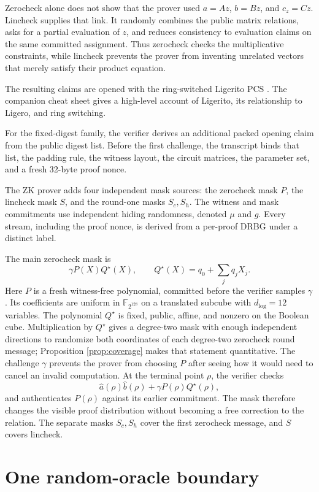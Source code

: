 \documentclass[11pt]{article}
\theoremstyle{definition}
\newcommand{\F}{\mathbb{F}}
\newcommand{\K}{\F_{2^{128}}}
\begin{document}
Zerocheck alone does not show that the prover used $a=Az$, $b=Bz$, and
$c_z=Cz$.  Lincheck supplies that link.  It randomly combines the public
matrix relations, asks for a partial evaluation of $z$, and reduces consistency
to evaluation claims on the same committed assignment.  Thus zerocheck checks
the multiplicative constraints, while lincheck prevents the prover from
inventing unrelated vectors that merely satisfy their product equation.

The resulting claims are opened with the ring-switched Ligerito PCS
\cite{Ligerito,DP24}.  The companion cheat sheet gives a high-level account of
Ligerito, its relationship to Ligero, and ring switching.

For the fixed-digest family, the verifier derives an additional packed opening
claim from the public digest list.  Before the first challenge, the transcript
binds that list, the padding rule, the witness layout, the circuit matrices, the
parameter set, and a fresh 32-byte proof nonce.

The ZK prover adds four independent mask sources: the zerocheck mask $P$, the
lincheck mask $S$, and the round-one masks $S_c,S_h$.  The witness and mask
commitments use independent hiding randomness, denoted $\mu$ and $g$.  Every
stream, including the proof nonce, is derived from a per-proof DRBG under a
distinct label.

The main zerocheck mask is
\[
  \gamma P(X)Q^\star(X),
  \qquad
  Q^\star(X)=q_0+\sum_j q_jX_j.
\]
Here $P$ is a fresh witness-free polynomial, committed before the verifier
samples $\gamma$.  Its coefficients are uniform in $\K$ on a translated
subcube with $d_{\log}=12$ variables.  The polynomial $Q^\star$ is fixed,
public, affine, and nonzero on the Boolean cube.  Multiplication by $Q^\star$
gives a degree-two mask with enough independent directions to randomize both
coordinates of each degree-two zerocheck round message; Proposition
\ref{prop:coverage} makes that statement quantitative.  The challenge
$\gamma$ prevents the prover from choosing $P$ after seeing how it would need
to cancel an invalid computation.  At the terminal point $\rho$, the verifier
checks
\[
  \widehat a(\rho)\widehat b(\rho)
  +\gamma P(\rho)Q^\star(\rho),
\]
and authenticates $P(\rho)$ against its earlier commitment.  The mask therefore
changes the visible proof distribution without becoming a free correction to
the relation.  The separate masks $S_c,S_h$ cover the first zerocheck message,
and $S$ covers lincheck.

\section{One random-oracle boundary}\label{sec:ro}
\end{document}
